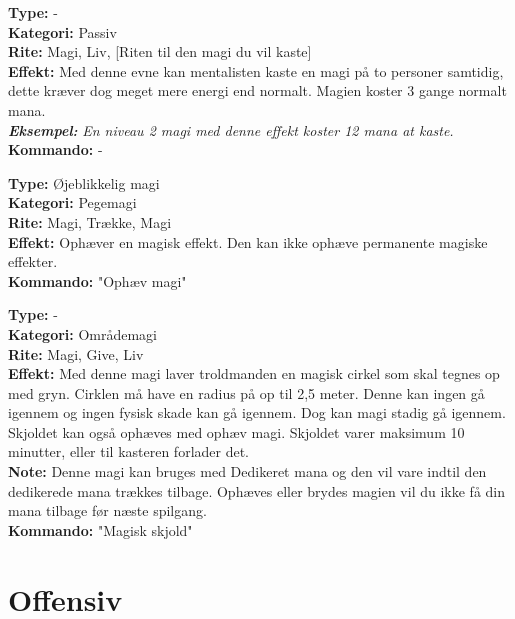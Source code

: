 \begin{primærMagi*}
\textbf{Type:} - \\
\textbf{Kategori:} Passiv\\
\textbf{Rite:} Magi, Liv, [Riten til den magi du vil kaste]\\
\textbf{Effekt:} Med denne evne kan mentalisten kaste en magi på to personer samtidig, dette kræver dog meget mere energi end normalt. Magien koster 3 gange normalt mana. \\
\textit{\textbf{Eksempel:}} \textit{En niveau 2 magi med denne effekt koster 12 mana at kaste.}\\
\textbf{Kommando:} -
\end{primærMagi*}

\begin{primærMagi*}
\textbf{Type:} Øjeblikkelig magi\\
\textbf{Kategori:} Pegemagi\\
\textbf{Rite:} Magi, Trække, Magi\\
\textbf{Effekt:} Ophæver en magisk effekt. Den kan ikke ophæve permanente magiske effekter.\\
\textbf{Kommando:} "Ophæv magi"
\end{primærMagi*}

\begin{primærMagi*}
\textbf{Type:} -\\
\textbf{Kategori:} Områdemagi \\
\textbf{Rite:} Magi, Give, Liv \\
\textbf{Effekt:} Med denne magi laver troldmanden en magisk cirkel som skal tegnes op med gryn. Cirklen må have
en radius på op til 2,5 meter. Denne kan ingen gå igennem og ingen fysisk skade kan gå igennem. Dog kan magi stadig gå igennem. Skjoldet kan også ophæves med ophæv magi. Skjoldet varer maksimum 10 minutter, eller til kasteren forlader det. \\
\textbf{Note:} Denne magi kan bruges med Dedikeret mana og den vil vare indtil den dedikerede mana trækkes tilbage. Ophæves eller brydes magien vil du ikke få din mana tilbage før næste spilgang.\\
\textbf{Kommando:} "Magisk skjold"
\end{primærMagi*}

\section{Offensiv}

